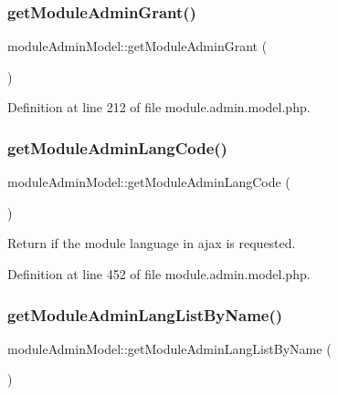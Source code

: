 \hypertarget{classmoduleAdminModel_a84f8431365473f8ddb70cb9cc1976db1}{}\label{classmoduleAdminModel_a84f8431365473f8ddb70cb9cc1976db1} 
\subsubsection{\texorpdfstring{get\+Module\+Admin\+Grant()}{getModuleAdminGrant()}}
{\footnotesize\ttfamily module\+Admin\+Model\+::get\+Module\+Admin\+Grant (\begin{DoxyParamCaption}{ }\end{DoxyParamCaption})}



Definition at line 212 of file module.\+admin.\+model.\+php.

\hypertarget{classmoduleAdminModel_a783b7e9e5a0db68d0eb782fff6f7e461}{}\label{classmoduleAdminModel_a783b7e9e5a0db68d0eb782fff6f7e461} 
\subsubsection{\texorpdfstring{get\+Module\+Admin\+Lang\+Code()}{getModuleAdminLangCode()}}
{\footnotesize\ttfamily module\+Admin\+Model\+::get\+Module\+Admin\+Lang\+Code (\begin{DoxyParamCaption}{ }\end{DoxyParamCaption})}



Return if the module language in ajax is requested. 



Definition at line 452 of file module.\+admin.\+model.\+php.

\hypertarget{classmoduleAdminModel_ab5982d758fb39c6d56c41af9827845cf}{}\label{classmoduleAdminModel_ab5982d758fb39c6d56c41af9827845cf} 
\subsubsection{\texorpdfstring{get\+Module\+Admin\+Lang\+List\+By\+Name()}{getModuleAdminLangListByName()}}
{\footnotesize\ttfamily module\+Admin\+Model\+::get\+Module\+Admin\+Lang\+List\+By\+Name (\begin{DoxyParamCaption}{ }\end{DoxyParamCaption})}



